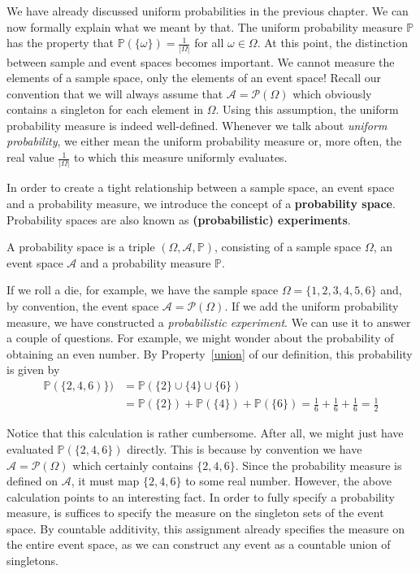 We have already discussed uniform probabilities in the previous chapter. We can now formally explain
what we meant by that. The uniform probability measure $ \mathbb{P} $ has the property that
$ \mathbb{P}(\{\omega\}) = \frac{1}{|\Omega|} $ for all $ \omega \in \Omega $. At this point, the
distinction between sample and event spaces becomes important. We cannot measure the elements of a
sample space, only the elements of an event space! Recall our convention that we will always assume
that $ \mathcal{A} = \mathcal{P}(\Omega) $ which obviously contains a singleton for each element in
$ \Omega $. Using this assumption, the uniform probability measure is indeed well-defined. Whenever we talk about
\textit{uniform probability}, we either mean the uniform probability measure or, more often, the real
value $ \frac{1}{|\Omega|} $ to which this measure uniformly evaluates.

In order to create a tight relationship between a sample space, an event space and a probability measure,
we introduce the concept of a \textbf{probability space}. Probability spaces are also known as 
\textbf{(probabilistic) experiments}.

\begin{Definition} \label{def:ProbabilitySpace}
A probability space is a triple $ (\Omega, \mathcal{A}, \mathbb{P}) $, consisting of a sample space $ \Omega $,
an event space $ \mathcal{A} $ and a probability measure $ \mathbb{P} $.
\end{Definition}

If we roll a die, for example, we have the sample space $ \Omega = \{1,2,3,4,5,6\} $ and, by 
convention, the event space $ \mathcal{A} = \mathcal{P}(\Omega) $. If we add the uniform probability measure, 
we have constructed  a \emph{probabilistic experiment}. We can use it to answer a couple of questions. For example, we 
might wonder about the probability of obtaining an even number. By Property~\ref{union} of our definition, this 
probability is given by
\begin{align}
\mathbb{P}(\{2,4,6)\}) &= \mathbb{P}(\{2\} \cup \{4\} \cup \{6\}) \\
&= \mathbb{P}(\{2\}) + \mathbb{P}(\{4\})
+ \mathbb{P}(\{6\}) = \frac{1}{6} + \frac{1}{6} + \frac{1}{6} = \frac{1}{2}
\end{align}

Notice that this calculation is rather cumbersome. After all, we might just have evaluated 
$ \mathbb{P}(\{2,4,6\}) $ directly. This is because by convention we have $ \mathcal{A} = \mathcal{P}(\Omega) $ which certainly contains $ \{2,4,6\} $.
Since the probability measure is defined on $ \mathcal{A} $, it must map $ \{2,4,6\} $ to some real number.
However, the above calculation points to an interesting fact. In order
to fully specify a probability measure, is suffices to specify the measure on the singleton sets of the
event space. By countable additivity, this assignment already specifies the measure on the entire event space, as we can
construct any event as a countable union of singletons.

